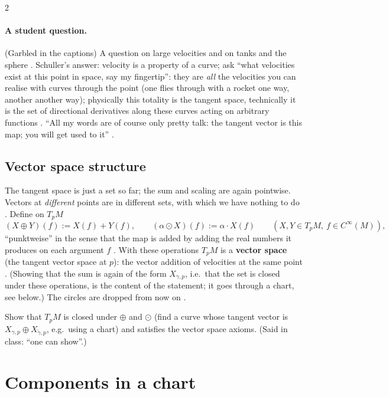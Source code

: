 \begin{paracol}{2}
\paragraph{A student question.} (Garbled in the captions) A question on large velocities and on tanks and the sphere
. Schuller's answer: velocity is a property of a curve; ask ``what velocities
exist at this point in space, say my fingertip'': they are \emph{all} the velocities you can realise with curves through
the point (one flies through with a rocket one way, another another way); physically this totality is the tangent space,
technically it is the set of directional derivatives along these curves acting on arbitrary functions
. ``All my words are of course only pretty talk: the tangent vector is
this map; you will get used to it'' .

\subsection{Vector space structure}\label{ssec:ts-vs}

The tangent space is just a set so far; the sum and scaling are again pointwise. Vectors at \emph{different} points are in
different sets, with which we have nothing to do . Define on $T_pM$
\[
  (X\oplus Y)(f):=X(f)+Y(f),\qquad (\alpha\odot X)(f):=\alpha\cdot X(f)\qquad(X,Y\in T_pM,\ f\in C^\infty(M)),
\]
``punktweise'' in the sense that the map is added by adding the real numbers it produces on each argument
$f$ .
With these operations $T_pM$ is a \textbf{vector space} (the tangent vector space at $p$): the vector addition of
velocities at the same point .
(Showing that the sum is again of the form $X_{\gamma,p}$, i.e.\ that the set is closed under these operations, is
the content of the statement; it goes through a chart, see below.) The circles are dropped from now on
.
\begin{exercise}\label{ex:ts-vs}
Show that $T_pM$ is closed under $\oplus$ and $\odot$ (find a curve whose tangent vector is $X_{\gamma,p}\oplus X_{\tilde\gamma,p}$,
e.g.\ using a chart) and satisfies the vector space axioms. (Said in class: ``one can show''.)
\end{exercise}

\section{Components in a chart}\label{sec:ts-components}


\end{paracol}

